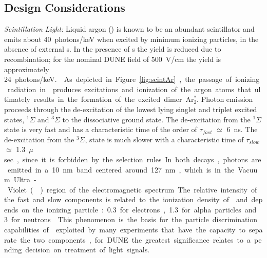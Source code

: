 \subsection{Design Considerations}
\label{sec:fdsp-pd-des-consid}

\emph{Scintillation Light:} Liquid argon (\lar) is known to be an abundant scintillator and emits about \SI{40}{photons/keV} when excited  by minimum ionizing particles\cite{Doke:1990rza},
in the absence of external \efield{}s. In the presence of \efield{}s the yield is reduced due to recombination; for the nominal DUNE  field of \SI{500}{V/cm} the yield is approximately \SI{24}{photons/keV.}~\cite{PhysRevB.20.3486}. 

As depicted in Figure~\ref{fig:scintAr}, the passage of ionizing radiation in \lar produces excitations and ionization of the argon atoms that ultimately results in the formation of the excited dimer Ar$^*_2$.  
Photon emission proceeds through the de-excitation of the lowest lying singlet and triplet excited states, $^{1}\Sigma$ and 
$^{3}\Sigma$ to the dissociative ground state. The de-excitation from the $^{1}\Sigma$ state is very fast and has a characteristic time of the order of 
$\tau_{fast}$ $\simeq$ \SI{6}{ns}. The de-excitation from the $^{3}\Sigma$, state is much slower with a characteristic time of $\tau_{slow}$ $\simeq$ \SI{1.3}{$\mu$sec}, since it is forbidden by the selection rules. 
In both decays, photons are emitted in a \SI{10}{nm} band centered around \SI{127}{nm}, which is in the Vacuum Ultra-Violet () region of the electromagnetic spectrum.
The relative intensity of the  fast and slow components is related to the ionization density of \lar and depends on the ionizing particle: \num{0.3} for electrons, \num{1.3} for alpha particles and \num{3} for neutrons~\cite{PhysRevB.27.5279}.
This phenomenon is the basis for the  particle discrimination capabilities of \lar exploited by many experiments that have the capacity to separate the two components, for DUNE the greatest significance relates to a pending decision on treatment of light signals.

